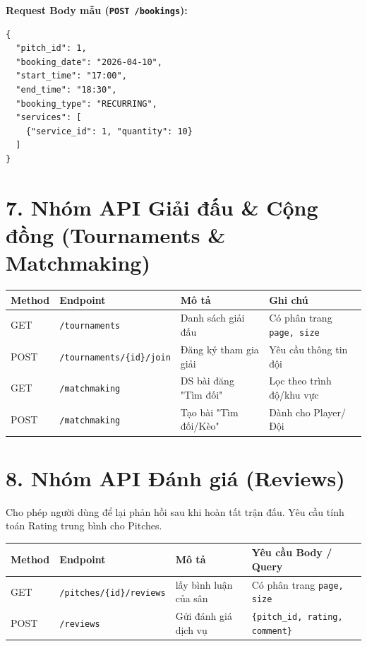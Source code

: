 \documentclass[12pt,a4paper]{article}
\begin{document}
\textbf{Request Body mẫu (\texttt{POST /bookings}):}
\begin{verbatim}
{
  "pitch_id": 1,
  "booking_date": "2026-04-10",
  "start_time": "17:00",
  "end_time": "18:30",
  "booking_type": "RECURRING",
  "services": [
    {"service_id": 1, "quantity": 10}
  ]
}
\end{verbatim}

\section*{7. Nhóm API Giải đấu \& Cộng đồng (Tournaments \& Matchmaking)}

\vspace{0.3cm}
\noindent
\renewcommand{\arraystretch}{1.3}
\begin{tabular}{|p{1.5cm}|p{5cm}|p{4cm}|p{4.5cm}|}
    \hline
    \textbf{Method} & \textbf{Endpoint} & \textbf{Mô tả} & \textbf{Ghi chú} \\
    \hline
    GET & \texttt{/tournaments} & Danh sách giải đấu & Có phân trang \texttt{page, size} \\
    \hline
    POST & \texttt{/tournaments/\{id\}/join} & Đăng ký tham gia giải & Yêu cầu thông tin đội \\
    \hline
    GET & \texttt{/matchmaking} & DS bài đăng "Tìm đối" & Lọc theo trình độ/khu vực \\
    \hline
    POST & \texttt{/matchmaking} & Tạo bài "Tìm đối/Kèo" & Dành cho Player/Đội \\
    \hline
\end{tabular}

\section*{8. Nhóm API Đánh giá (Reviews)}
Cho phép người dùng để lại phản hồi sau khi hoàn tất trận đấu. Yêu cầu tính toán Rating trung bình cho Pitches.

\vspace{0.3cm}
\noindent
\renewcommand{\arraystretch}{1.3}
\begin{tabular}{|p{1.5cm}|p{4.5cm}|p{4.5cm}|p{4.5cm}|}
    \hline
    \textbf{Method} & \textbf{Endpoint} & \textbf{Mô tả} & \textbf{Yêu cầu Body / Query} \\
    \hline
    GET & \texttt{/pitches/\{id\}/reviews} & lấy bình luận của sân & Có phân trang \texttt{page, size} \\
    \hline
    POST & \texttt{/reviews} & Gửi đánh giá dịch vụ & \texttt{\{pitch\_id, rating, comment\}} \\
    \hline
\end{tabular}
\end{document}
